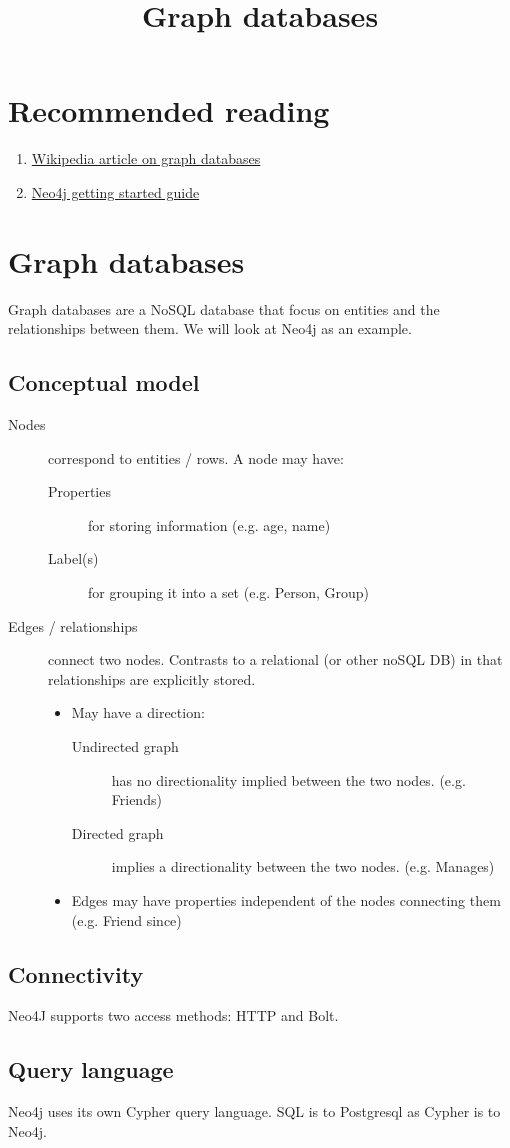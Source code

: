 \documentclass{pgnotes}
\title{Graph databases}
\begin{document}
\maketitle

\section*{Recommended reading}

\begin{enumerate}
\item \href{https://en.wikipedia.org/wiki/Graph_database}{Wikipedia article on graph databases}
\item \href{https://neo4j.com/docs/getting-started/current/}{Neo4j getting started guide}
\end{enumerate}

\section{Graph databases}

Graph databases are a NoSQL database that focus on entities and the relationships between them.
We will look at Neo4j as an example. 

\subsection{Conceptual model}

\begin{description}
\item[Nodes] correspond to entities / rows.
  A node may have:
  \begin{description}
  \item[Properties] for storing information (e.g. age, name)
  \item[Label(s)] for grouping it into a set (e.g. Person, Group)
  \end{description}
\item[Edges / relationships] connect two nodes. Contrasts to a relational (or other noSQL DB) in that relationships are explicitly stored. 
  \begin{itemize}
  \item May have a direction:
    \begin{description}
    \item[Undirected graph] has no directionality implied between the two nodes. (e.g. Friends)
    \item[Directed graph] implies a directionality between the two nodes. (e.g. Manages)
    \end{description}
  \item Edges may have properties independent of the nodes connecting them (e.g. Friend since)
  \end{itemize}
\end{description}

\subsection{Connectivity}

Neo4J supports two access methods: HTTP and Bolt.

\subsection{Query language}

Neo4j uses its own Cypher query language.
SQL is to Postgresql as Cypher is to Neo4j.
\end{document}
